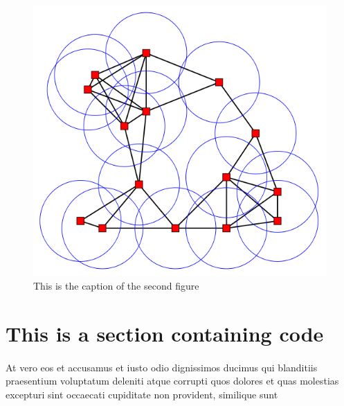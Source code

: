 \documentclass[a4paper]{article}
\begin{document}
\begin{figure}[H]
\centering
\includegraphics[width=\linewidth]{assets/figures/figure_2.png}
\caption{This is the caption of the second figure}
\label{fig:figure 2}
\end{figure}

\newpage


\section{This is a section containing code}
\paragraph{}
At vero eos et accusamus et iusto odio dignissimos ducimus qui blanditiis praesentium voluptatum deleniti atque
corrupti quos dolores et quas molestias excepturi sint occaecati cupiditate non provident, similique sunt 
\end{document}
